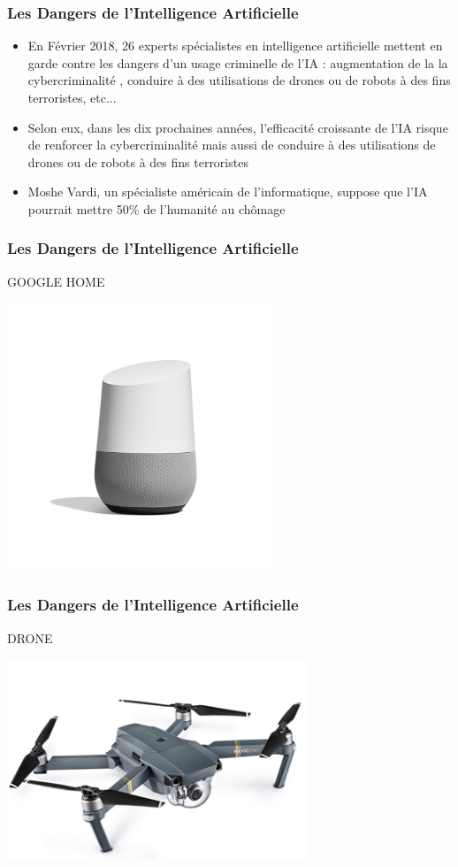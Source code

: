 \documentclass{beamer}
\begin{document}
	\begin{frame}[fragile]
	\frametitle{Les Dangers de l'Intelligence Artificielle}
	\begin{itemize}
	\itemsep1em
		\item En Février 2018, 26 experts spécialistes en intelligence artificielle mettent en garde contre les dangers d'un usage criminelle de l'IA : augmentation de la la cybercriminalité , conduire à des utilisations de drones ou de robots à des fins terroristes, etc...
		\item Selon eux, dans les dix prochaines années, l'efficacité croissante de l'IA risque de renforcer la cybercriminalité mais aussi de conduire à des utilisations de drones ou de robots à des fins terroristes
		\item Moshe Vardi, un spécialiste américain de l'informatique, suppose que l'IA pourrait mettre 50\% de l'humanité au chômage
		\end{itemize}
	\end{frame}

	\begin{frame}[fragile]
	\frametitle{Les Dangers de l'Intelligence Artificielle}
	GOOGLE HOME
	\centerline{\includegraphics[height=8cm]{googlehome.png}}
	\end{frame}
	
	\begin{frame}[fragile]
	\frametitle{Les Dangers de l'Intelligence Artificielle}
	DRONE
	\centerline{\includegraphics[height=6cm]{drone.png}}
	\end{frame}
\end{document}
